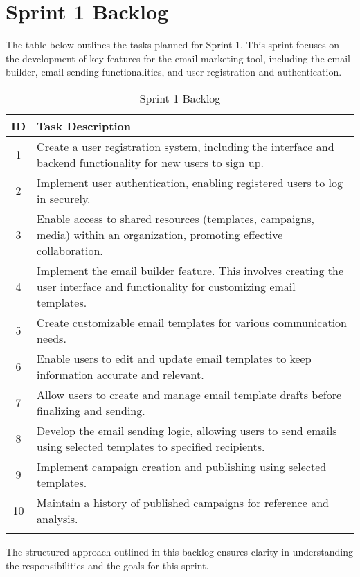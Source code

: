 \section{Sprint 1 Backlog}

The table below outlines the tasks planned for Sprint 1. This sprint focuses on the development of key features for the email marketing tool, including the email builder, email sending functionalities, and user registration and authentication.

\begin{longtable}{|c|p{}|}
	\hline
	\textbf{ID} & \textbf{Task Description}                                                                                                         \\
	\hline
	1           & Create a user registration system, including the interface and backend functionality for new users to sign up.                    \\
	\hline
	2           & Implement user authentication, enabling registered users to log in securely.                                                      \\
	\hline
	3           & Enable access to shared resources (templates, campaigns, media) within an organization, promoting effective collaboration.        \\
	\hline
	4           & Implement the email builder feature. This involves creating the user interface and functionality for customizing email templates. \\
	\hline
	5           & Create customizable email templates for various communication needs.                                                              \\
	\hline
	6           & Enable users to edit and update email templates to keep information accurate and relevant.                                        \\
	\hline
	7           & Allow users to create and manage email template drafts before finalizing and sending.                                             \\
	\hline
	8           & Develop the email sending logic, allowing users to send emails using selected templates to specified recipients.                  \\
	\hline
	9           & Implement campaign creation and publishing using selected templates.                                                              \\
	\hline
	10          & Maintain a history of published campaigns for reference and analysis.                                                             \\
	\hline
	\caption{Sprint 1 Backlog}
	\label{tab
	}
\end{longtable}


The structured approach outlined in this backlog ensures clarity in understanding the responsibilities and the goals for this sprint.
